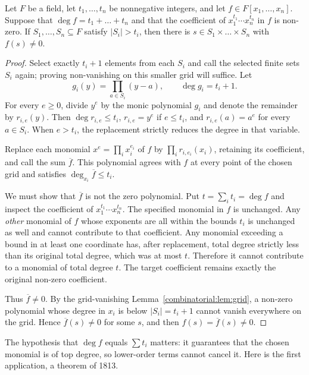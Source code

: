 \begin{theorem}\label{combinatorial:thm:cn}
Let $F$ be a field, let $t_1,\dots,t_n$ be nonnegative integers, and let
$f\in F[x_1,\dots,x_n]$. Suppose that $\deg f=t_1+\dots+t_n$ and that the coefficient of $x_1^{t_1}\cdots x_n^{t_n}$ in $f$ is non-zero. If $S_1,\dots,S_n\subseteq F$ satisfy $|S_i|>t_i$, then
there is $s\in S_1\times\dots\times S_n$ with $f(s)\ne0$.
\end{theorem}
\begin{proof}
Select exactly $t_i+1$ elements from each $S_i$ and call the selected finite
sets $S_i$ again; proving non-vanishing on this smaller grid will suffice. Let
\[
g_i(y)=\prod_{a\in S_i}(y-a),
\qquad \deg g_i=t_i+1.
\]
For every $e\ge0$, divide $y^e$ by the monic
polynomial $g_i$ and denote the remainder by
$r_{i,e}(y)$. Then
$\deg r_{i,e}\le t_i$,
$r_{i,e}=y^e$ if $e\le t_i$,
and $r_{i,e}(a)=a^e$ for every $a\in S_i$.
When $e>t_i$, the replacement strictly
reduces the degree in that variable.

Replace each monomial $x^e=\prod_i x_i^{e_i}$
of $f$ by $\prod_i r_{i,e_i}(x_i)$,
retaining its coefficient, and call the sum
$\overline f$. This polynomial agrees
with $f$ at every point of the chosen
grid and satisfies
$\deg_{x_i}\overline f\le t_i$.

We must show that $\overline f$ is not the
zero polynomial. Put $t=\sum_i t_i=\deg f$
and inspect the coefficient of
$x_1^{t_1}\cdots x_n^{t_n}$.
The specified monomial in $f$ is unchanged.
Any \emph{other} monomial of $f$ whose
exponents are all within the bounds $t_i$
is unchanged as well and cannot contribute
to that coefficient. Any monomial exceeding
a bound in at least one coordinate has,
after replacement, total degree strictly
less than its original total degree, which
was at most $t$. Therefore it cannot
contribute to a monomial of total degree
$t$. The target coefficient remains exactly
the original non-zero coefficient.

Thus $\overline f\ne0$. By the grid-vanishing
Lemma~\ref{combinatorial:lem:grid}, a non-zero
polynomial whose degree in $x_i$ is below
$|S_i|=t_i+1$ cannot vanish everywhere
on the grid. Hence $\overline f(s)\ne0$
for some $s$, and then $f(s)=\overline f(s)\ne0$.
\end{proof}

The hypothesis that $\deg f$ equals $\sum t_i$ matters: it guarantees that the chosen monomial is of top degree, so lower-order terms cannot cancel it. Here is the first application, a theorem of 1813.

